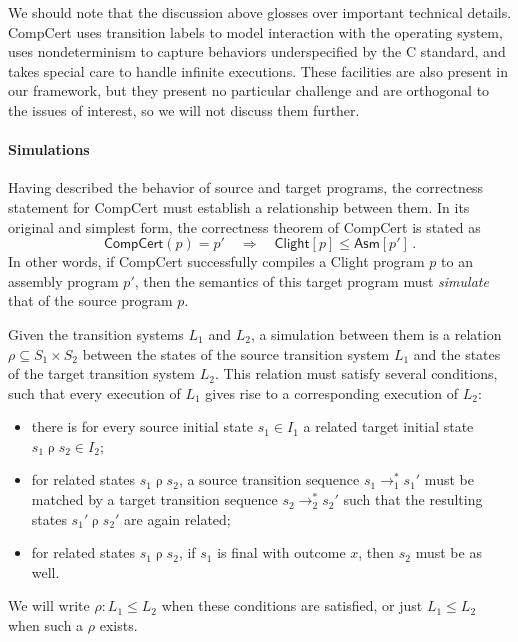 \documentclass[acmsmall,screen,review,anonymous]{acmart}
\newcommand{\kw}[1]{\ensuremath{ \mathsf{#1} }}
\begin{document}
We should note that the discussion above glosses over important technical details.
CompCert uses transition labels to model interaction with the operating system,
uses nondeterminism to capture behaviors underspecified by the C standard,
and takes special care to handle infinite executions.
These facilities are also present in our framework,
but they present no particular challenge and
are orthogonal to the issues of interest,
so we will not discuss them further.

\paragraph{Simulations}

Having described the behavior of source and target programs,
the correctness statement for CompCert must establish a relationship between them.
In its original and simplest form,
the correctness theorem of CompCert is stated as
\begin{equation}
    \kw{CompCert}(p) = p'
    \quad\Longrightarrow\quad
    \kw{Clight}[p] \le \kw{Asm}[p']
    \,.
    \label{eqn:ccc-wp}
\end{equation}
In other words,
if CompCert successfully compiles a Clight program $p$
to an assembly program $p'$,
then the semantics of this target program must
\emph{simulate} that of the source program $p$.

Given the transition systems $L_1$ and $L_2$,
a simulation between them is a relation $\rho \subseteq S_1 \times S_2$
between the states of the source transition system $L_1$
and the states of the target transition system $L_2$.
This relation must satisfy several conditions,
such that every execution of $L_1$ gives rise
to a corresponding execution of $L_2$:
\begin{itemize}
  \item there is for every source initial state $s_1 \in I_1$
    a related target initial state $s_1 \mathrel\rho s_2 \in I_2$;
  \item for related states $s_1 \mathrel\rho s_2$,
    a source transition sequence $s_1 \rightarrow_1^* s_1'$ must be matched by
    a target transition sequence $s_2 \rightarrow_2^* s_2'$ such that
    the resulting states $s_1' \mathrel\rho s_2'$ are again related;
  \item for related states $s_1 \mathrel\rho s_2$,
    if $s_1$ is final with outcome $x$,
    then $s_2$ must be as well.
\end{itemize}
We will write $\rho : L_1 \le L_2$ when these conditions are satisfied,
or just $L_1 \le L_2$ when such a $\rho$ exists.
\end{document}
